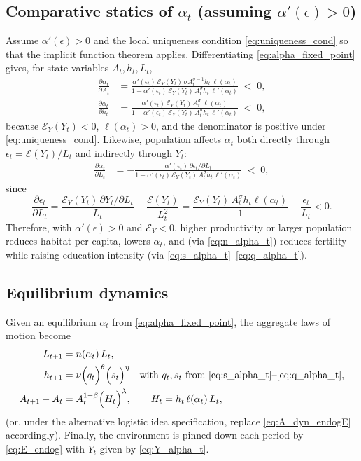 \documentclass[11pt]{article}
\begin{document}
\subsection{Comparative statics of $\alpha_t$ (assuming $\alpha'(\epsilon)>0$)}
Assume $\alpha'(\epsilon)>0$ and the local uniqueness condition \eqref{eq:uniqueness_cond} so that the implicit function theorem applies.
Differentiating \eqref{eq:alpha_fixed_point} gives, for state variables $A_t,h_t,L_t$,
\begin{align}
\frac{\partial \alpha_t}{\partial A_t}
&=
\frac{\alpha'(\epsilon_t)\,\mathcal{E}_Y(Y_t)\,\sigma A_t^{\sigma-1} h_t\,\ell(\alpha_t)}
{1-\alpha'(\epsilon_t)\,\mathcal{E}_Y(Y_t)\,A_t^{\sigma}h_t\,\ell'(\alpha_t)}
\;<\;0,
\label{eq:dalpha_dA}\\[6pt]
\frac{\partial \alpha_t}{\partial h_t}
&=
\frac{\alpha'(\epsilon_t)\,\mathcal{E}_Y(Y_t)\,A_t^{\sigma}\,\ell(\alpha_t)}
{1-\alpha'(\epsilon_t)\,\mathcal{E}_Y(Y_t)\,A_t^{\sigma}h_t\,\ell'(\alpha_t)}
\;<\;0,
\label{eq:dalpha_dh}
\end{align}
because $\mathcal{E}_Y(Y_t)<0$, $\ell(\alpha_t)>0$, and the denominator is positive under \eqref{eq:uniqueness_cond}.
Likewise, population affects $\alpha_t$ both directly through $\epsilon_t=\mathcal{E}(Y_t)/L_t$ and indirectly through $Y_t$:
\begin{align}
\frac{\partial \alpha_t}{\partial L_t}
&=
-\frac{\alpha'(\epsilon_t)\,\partial \epsilon_t/\partial L_t}
{1-\alpha'(\epsilon_t)\,\mathcal{E}_Y(Y_t)\,A_t^{\sigma}h_t\,\ell'(\alpha_t)}
\;<\;0,
\label{eq:dalpha_dL}
\end{align}
since
\[
\frac{\partial \epsilon_t}{\partial L_t}
=
\frac{\mathcal{E}_Y(Y_t)\,\partial Y_t/\partial L_t}{L_t}
-\frac{\mathcal{E}(Y_t)}{L_t^2}
=
\frac{\mathcal{E}_Y(Y_t)\,A_t^{\sigma}h_t\ell(\alpha_t)}{1}
-\frac{\epsilon_t}{L_t}
<0.
\]
Therefore, with $\alpha'(\epsilon)>0$ and $\mathcal{E}_Y<0$, higher productivity or larger population reduces habitat per capita, lowers $\alpha_t$,
and (via \eqref{eq:n_alpha_t}) reduces fertility while raising education intensity (via \eqref{eq:s_alpha_t}--\eqref{eq:q_alpha_t}).

\subsection{Equilibrium dynamics}
Given an equilibrium $\alpha_t$ from \eqref{eq:alpha_fixed_point}, the aggregate laws of motion become
\begin{align}
L_{t+1} &= n(\alpha_t)\,L_t,
\label{eq:L_dyn_endogE}\\
h_{t+1} &= \nu\Big(q_t\Big)^{\theta}\Big(s_t\Big)^{\eta}
\quad \text{with } q_t,s_t \text{ from \eqref{eq:s_alpha_t}--\eqref{eq:q_alpha_t}},
\label{eq:h_dyn_endogE}\\
A_{t+1}-A_t &= A_t^{1-\beta}\Big(H_t\Big)^{\lambda},
\qquad H_t=h_t\,\ell(\alpha_t)\,L_t,
\label{eq:A_dyn_endogE}
\end{align}
(or, under the alternative logistic idea specification, replace \eqref{eq:A_dyn_endogE} accordingly).
Finally, the environment is pinned down each period by \eqref{eq:E_endog} with $Y_t$ given by \eqref{eq:Y_alpha_t}.
\end{document}
